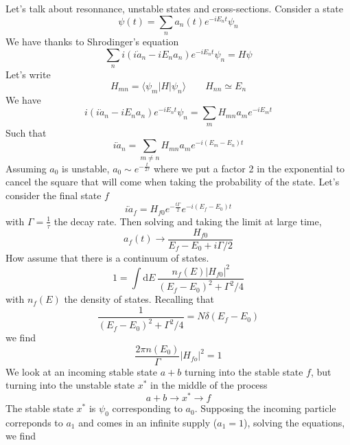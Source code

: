\documentclass[a4paper]{book}
\theoremstyle{definition}
\theoremstyle{remark}
\begin{document}
Let's talk about resonnance, unstable states and cross-sections. Consider a state 
\begin{equation}
    \psi (t) = \sum_n a_n(t) e^{-iE_n t} \psi_n
\end{equation}
We have thanks to Shrodinger's equation 
\begin{equation}
    \sum_n i (i\dot{a}_n - iE_n a_n )e^{-iE_n t}\psi_n = H \psi 
\end{equation}
Let's write 
\begin{equation}
    H_{mn} = \langle\psi_m|H|\psi_n\rangle \qquad H_{nn} \simeq E_n
\end{equation}
We have 
\begin{equation}
   i (i\dot{a}_n - iE_n a_n )e^{-iE_n t}\psi_n = \sum_m H_{mn} a_m e^{-iE_m t}
\end{equation}
Such that 
\begin{equation}
    i \dot{a}_n = \sum_{m\neq n} H_{mn} a_m e^{-i(E_m - E_n)t}
\end{equation}
Assuming $a_0$ is unstable, $a_0 \sim e^{-\frac{t}{2\tau}}$ where we put a factor 2 in the exponential to cancel the square that will come when taking the probability of the state. Let's consider the final state $f$
\begin{equation}
    i \dot{a}_f = H_{f0} e^{-\frac{t\Gamma}{2}} e^{-i(E_f - E_0)t}
\end{equation}
with $\Gamma = \frac{1}{\tau}$ the decay rate. Then solving and taking the limit at large time,
\begin{equation}
    a_f(t) \rightarrow \frac{H_{f0}}{E_f - E_0 + i\Gamma/2}
\end{equation}
How assume that there is a continuum of states. 
\begin{equation}
    1 = \int \text{d}E ~ \frac{n_f(E)|H_{f0}|^2}{(E_f - E_0)^2 + \Gamma^2 / 4} 
\end{equation}
with $n_f(E)$ the density of states. Recalling that 
\begin{equation}
    \frac{1}{(E_f - E_0)^2 + \Gamma^2 / 4} = N\delta(E_f - E_0)
\end{equation}
we find 
\begin{equation}
    \frac{2\pi n(E_0)}{\Gamma}|H_{fo}|^2 = 1
\end{equation}
We look at an incoming stable state $a+b$ turning into the stable state $f$, but turning into the unstable state $x^*$ in the middle of the process 
\begin{equation}
    a+b \rightarrow x^* \rightarrow f
\end{equation}
The stable state $x^*$ is $\psi_0$ corresponding to $a_0$. Supposing the incoming particle correponds to $a_1$ and comes in an infinite supply ($a_1 = 1$), solving the equations, we find 
\end{document}
